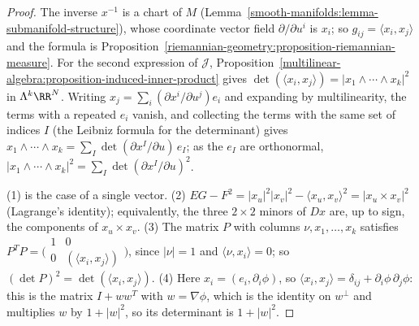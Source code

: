 \begin{proof}
The inverse $x^{-1}$ is a chart of $M$ (Lemma~\ref{smooth-manifolds:lemma-submanifold-structure}), whose coordinate vector field $\partial/\partial u^i$ is $x_i$;
so $g_{ij} = \langle x_i, x_j\rangle$ and the formula is Proposition~\ref{riemannian-geometry:proposition-riemannian-measure}. For the second expression of
$\mathcal{J}$, Proposition~\ref{multilinear-algebra:proposition-induced-inner-product} gives $\det(\langle x_i, x_j\rangle) = |x_1 \wedge \cdots \wedge x_k|^2$ in
$\Lambda^k\RR^N$. Writing $x_j = \sum_i(\partial x^i/\partial u^j)e_i$ and expanding by multilinearity, the terms with a repeated $e_i$ vanish, and collecting the
terms with the same set of indices $I$ (the Leibniz formula for the determinant) gives $x_1 \wedge \cdots \wedge x_k = \sum_I\det(\partial x^I/\partial u)\,e_I$; as the
$e_I$ are orthonormal, $|x_1 \wedge \cdots \wedge x_k|^2 = \sum_I\det(\partial x^I/\partial u)^2$.

(1) is the case of a single vector. (2) $EG - F^2 = |x_u|^2|x_v|^2 - \langle x_u, x_v\rangle^2 = |x_u \times x_v|^2$ (Lagrange's identity); equivalently, the three
$2 \times 2$ minors of $Dx$ are, up to sign, the components of $x_u \times x_v$. (3) The matrix $P$ with columns $\nu, x_1, \ldots, x_k$ satisfies
$P^TP = \bigl(\begin{smallmatrix} 1 & 0\\ 0 & (\langle x_i, x_j\rangle)\end{smallmatrix}\bigr)$, since $|\nu| = 1$ and $\langle\nu, x_i\rangle = 0$; so
$(\det P)^2 = \det(\langle x_i, x_j\rangle)$. (4) Here $x_i = (e_i, \partial_i\phi)$, so $\langle x_i, x_j\rangle = \delta_{ij} + \partial_i\phi\,\partial_j\phi$: this is
the matrix $I + ww^T$ with $w = \nabla\phi$, which is the identity on $w^\perp$ and multiplies $w$ by $1 + |w|^2$, so its determinant is $1 + |w|^2$.
\end{proof}

